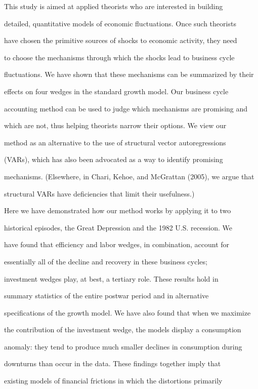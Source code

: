 \documentclass[fleqn,leqno,11pt]{article}
\begin{document}
This study is aimed at applied theorists who are interested in building

detailed, quantitative models of economic fluctuations. Once such theorists

have chosen the primitive sources of shocks to economic activity, they need

to choose the mechanisms through which the shocks lead to business cycle

fluctuations. We have shown that these mechanisms can be summarized by their

effects on four wedges in the standard growth model. Our business cycle

accounting method can be used to judge which mechanisms are promising and

which are not, thus helping theorists narrow their options. We view our

method as an alternative to the use of structural vector autoregressions

(VARs), which has also been advocated as a way to identify promising

mechanisms. (Elsewhere, in Chari, Kehoe, and McGrattan (2005), we argue that

structural VARs have deficiencies that limit their usefulness.)



Here we have demonstrated how our method works by applying it to two

historical episodes, the Great Depression and the 1982 U.S. recession. We

have found that efficiency and labor wedges, in combination, account for

essentially all of the decline and recovery in these business cycles;

investment wedges play, at best, a tertiary role. These results hold in

summary statistics of the entire postwar period and in alternative

specifications of the growth model. We have also found that when we maximize

the contribution of the investment wedge, the models display a consumption

anomaly: they tend to produce much smaller declines in consumption during

downturns than occur in the data. These findings together imply that

existing models of financial frictions in which the distortions primarily
\end{document}
